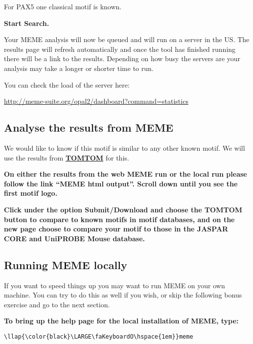 \documentclass[11pt]{article}
\begin{document}
For PAX5 one classical motif is known.

\textbf{Start Search.}

Your MEME analysis will now be queued and will run on a server in the
US. The results page will refresh automatically and once the tool has
finished running there will be a link to the results. Depending on how
busy the servers are your analysis may take a longer or shorter time to
run.

You can check the load of the server here:

\url{http://meme-suite.org/opal2/dashboard?command=statistics}

    \hypertarget{analyse-the-results-from-meme}{%
\subsection{Analyse the results from
MEME}\label{analyse-the-results-from-meme}}

We would like to know if this motif is similar to any other known motif.
We will use the results from
\textbf{\href{http://web.mit.edu/meme_v4.11.4/share/doc/tomtom.html}{TOMTOM}}
for this.

\textbf{On either the results from the web MEME run or the local run
please follow the link ``MEME html output''. Scroll down until you see
the first motif logo.}

\textbf{Click under the option Submit/Download and choose the TOMTOM
button to compare to known motifs in motif databases, and on the new
page choose to compare your motif to those in the JASPAR CORE and
UniPROBE Mouse database.}

    \hypertarget{running-meme-locally}{%
\subsection{Running MEME locally}\label{running-meme-locally}}

If you want to speed things up you may want to run MEME on your own
machine. You can try to do this as well if you wish, or skip the
following bonus exercise and go to the next section.

\textbf{To bring up the help page for the local installation of MEME,
type:}





\begin{terminalinput}
\begin{Verbatim}[commandchars=\\\{\}]
\llap{\color{black}\LARGE\faKeyboardO\hspace{1em}}meme
\end{Verbatim}
\end{terminalinput}
\end{document}
